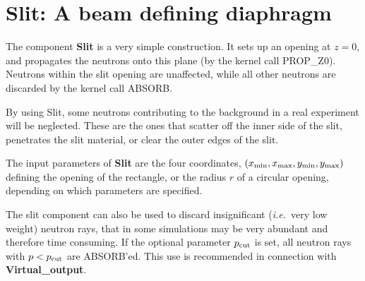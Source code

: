 \section{Slit: A beam defining diaphragm}
\label{slit}


The component {\bf Slit} is a very simple construction.
It sets up an opening at $z=0$, and propagates the neutrons
onto this plane (by the kernel call PROP\_Z0).
Neutrons within the slit opening are unaffected,
while all other neutrons
are discarded by the kernel call ABSORB.

By using {\rm Slit}, some neutrons contributing to the background
in a real experiment will be neglected.
These are the ones that scatter off the inner side
of the slit, penetrates the slit material,
or clear the outer edges of the slit.

The input parameters of {\bf Slit} are the four coordinates,
$(x_{\rm min}, x_{\rm max}, y_{\rm min}, y_{\rm max})$
defining the opening of the rectangle, or the radius $r$ of
a circular opening, depending on which parameters are specified.

The slit component can also be used to discard insignificant 
({\em i.e.}\ very low weight)
neutron rays, that in some simulations may be very abundant and therefore
time consuming. If the optional parameter $p_{\rm cut}$ is set, all
neutron rays with $p<p_{\rm cut}$ are ABSORB'ed.
This use is recommended in connection with {\bf Virtual\_output}.


